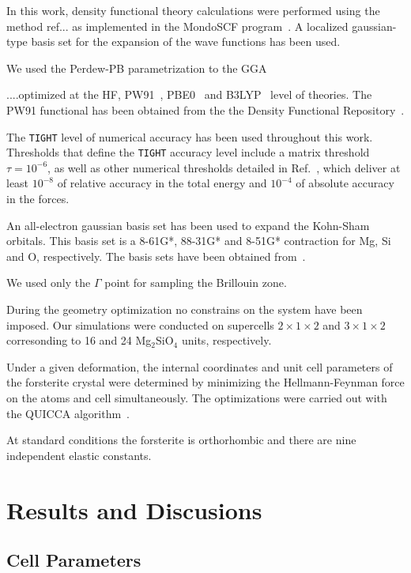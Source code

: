 \documentclass[pra,twocolumn,twocolumngrid,superbib]{revtex4} %
\begin{document}
In this work, density functional theory calculations were
performed using the method ref{...} as
implemented in the {\sc MondoSCF} program~\cite{MondoSCF_1.0-alpha-11}. 
A localized gaussian-type basis set for the expansion of the wave functions has been used.

We used the Perdew-PB parametrization to the GGA


....optimized at the 
HF, PW91~\cite{JPerdew92}, PBE0~\cite{Adamo99} and B3LYP~\cite{ABecke93} level of theories.
The PW91 functional has been obtained from the the Density Functional 
Repository~\cite{DFRepository}.



The {\tt TIGHT} level of numerical accuracy has been used throughout this work.
Thresholds that define the {\tt TIGHT} accuracy level include a matrix
threshold $\tau=10^{-6}$, as well as other numerical thresholds
detailed in Ref.~\cite{CTymczak04a}, which deliver at least $10^{-8}$ of
relative accuracy in the total energy and $10^{-4}$ of absolute accuracy
in the forces.

An all-electron gaussian basis set has been used to expand the Kohn-Sham orbitals.
This basis set is a 8-61G*, 88-31G* and 8-51G* contraction for Mg, Si and O, respectively.
The basis sets have been obtained from~\cite{CrystalLib}. 

We used only the $\Gamma$ point for sampling the Brillouin zone.

During the geometry optimization no constrains on the system have been imposed.
Our simulations were conducted on supercells $2\times1\times2$ and
$3\times1\times2$ corresonding to 16 and 24 Mg$_2$SiO$_4$ units, respectively.


Under a given deformation, the internal
coordinates and unit cell parameters of the forsterite
crystal were determined by minimizing the Hellmann-Feynman force 
on the atoms and cell simultaneously.
The optimizations were carried out with the QUICCA algorithm~\cite{KNemeth04,KNemeth05}.

At standard conditions the forsterite is orthorhombic and there are nine independent elastic
constants. 


\section{Results and Discusions}\label{Sec:ResultsAndDiscusions}

\subsection{Cell Parameters}
\end{document}
